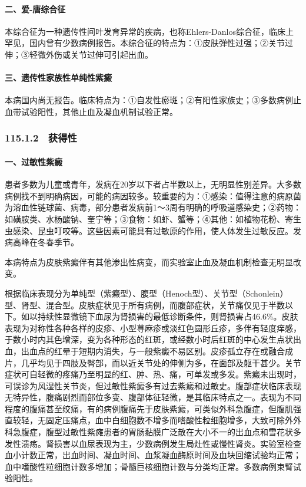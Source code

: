\paragraph{二、爱-唐综合征}

本综合征为一种遗传性间叶发育异常的疾病，也称Ehlers-Danlos综合征，临床上罕见，国内曾有少数病例报告。本综合征的特点为：①皮肤弹性过强；②关节过伸；③轻微外伤或关节过伸可引起出血。

\paragraph{三、遗传性家族性单纯性紫癜}

本病国内尚无报告。临床特点为：①自发性瘀斑；②有阳性家族史；③多数病例止血带试验阳性，其他止血及凝血机制试验正常。

\subsubsection{115.1.2　获得性}

\paragraph{一、过敏性紫癜}

患者多数为儿童或青年，发病在20岁以下者占半数以上，无明显性别差异。大多数病例找不到明确病因，可能的病因较多。较重要的为：①感染：值得注意的病原菌为溶血性链球菌、病毒，部分患者发病前1～3周有明确的呼吸道感染史；②药物：如磺胺类、水杨酸钠、奎宁等；③食物：如虾、蟹等；④其他：如植物花粉、寄生虫感染、昆虫叮咬等。这些因素可能具有过敏原的作用，使人体发生过敏反应。发病高峰在冬春季节。

本病特点为皮肤紫癜伴有其他渗出性病变，而实验室止血及凝血机制检查无明显改变。

根据临床表现分为单纯型（紫癜型）、腹型（Henoch型）、关节型（Schonlein）型、肾型、混合型。皮肤症状见于所有病例，而腹部症状，关节痛仅见于半数以下。如以持续性显微镜下血尿为肾损害的最低诊断条件，则肾损害占46.6\%。皮肤表现为对称性各种各样的皮疹、小型荨麻疹或淡红色圆形丘疹，多伴有轻度痒感，于数小时内其色增深，变为各种形态的红斑，或经数小时后红斑的中心发生点状出血，出血点的红晕于短期内消失，与一般紫癜不易区别。皮疹孤立存在或融合成片，几乎均见于四肢及臀部，而以近关节处的伸侧为多，在面部及躯干甚少。关节症状可自轻微的疼痛乃至明显的红、肿、热、痛，可单发或多发。紫癜未出现时，可误诊为风湿性关节炎，但过敏性紫癜多有过去紫癜和过敏史。腹部症状临床表现无特异性，腹痛剧烈而部位多变、腹部体征轻微，是其临床特点之一。表现为不同程度的腹痛甚至绞痛，有的病例腹痛先于皮肤紫癜，可类似外科急腹症，但腹肌强直较轻，无固定压痛点，血中白细胞数不增多而嗜酸性粒细胞增多，大致可除外外科急腹症，腹型过敏性紫瘫患者的胃肠黏膜广泛散在大小不一的出血点和雪花状多发性溃疡。肾损害以血尿表现为主，少数病例发生局灶性或慢性肾炎。实验室检查血小计数正常，出血时间、凝血时间、血浆凝血酶原时间及血块回缩试验均正常；血中嗜酸性粒细胞计数多增加；骨髓巨核细胞计数与分类均正常。多数病例束臂试验阳性。


